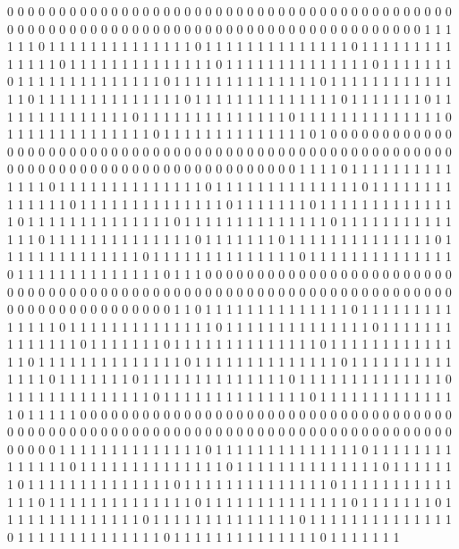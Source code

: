 0 0 0 0 0 0 0 0 0 0 0 0 0 0 0 0 0 0 0 0 0 0 0 0 0 0 0 0 0 0 0 0 0 0 0 0 0 0 0 0 0 0 0 0 0 0 0 0 0 0 0 0 0 0 0 0 0 0 0 0 0 0 0 0 0 0 0 0 0 0 0 0 0 0 0 0 0 0 0 0 0 0 0 
1 1 1 1 1 1 0 1 1 1 1 1 1 1 1 1 1 1 1 1 1 0 1 1 1 1 1 1 1 1 1 1 1 1 1 1 0 1 1 1 1 1 1 1 1 1 1 1 1 1 1 0 1 1 1 1 1 1 1 1 1 1 1 1 1 1 0 1 1 1 1 1 1 1 1 1 1 1 1 1 1 0 1 
1 1 1 1 1 1 0 1 1 1 1 1 1 1 1 1 1 1 1 1 1 0 1 1 1 1 1 1 1 1 1 1 1 1 1 1 0 1 1 1 1 1 1 1 1 1 1 1 1 1 1 0 1 1 1 1 1 1 1 1 1 1 1 1 1 1 0 1 1 1 1 1 1 1 1 1 1 1 1 1 1 0 1 
1 1 1 1 1 1 0 1 1 1 1 1 1 1 1 1 1 1 1 1 1 0 1 1 1 1 1 1 1 1 1 1 1 1 1 1 0 1 1 1 1 1 1 1 1 1 1 1 1 1 1 0 1 1 1 1 1 1 1 1 1 1 1 1 1 1 0 1 1 1 1 1 1 1 1 1 1 1 1 1 1 0 1 
0 0 0 0 0 0 0 0 0 0 0 0 0 0 0 0 0 0 0 0 0 0 0 0 0 0 0 0 0 0 0 0 0 0 0 0 0 0 0 0 0 0 0 0 0 0 0 0 0 0 0 0 0 0 0 0 0 0 0 0 0 0 0 0 0 0 0 0 0 0 0 0 0 0 0 0 0 0 0 0 0 0 0 
1 1 1 1 0 1 1 1 1 1 1 1 1 1 1 1 1 1 1 0 1 1 1 1 1 1 1 1 1 1 1 1 1 1 0 1 1 1 1 1 1 1 1 1 1 1 1 1 1 0 1 1 1 1 1 1 1 1 1 1 1 1 1 1 0 1 1 1 1 1 1 1 1 1 1 1 1 1 1 0 1 1 1 
1 1 1 1 0 1 1 1 1 1 1 1 1 1 1 1 1 1 1 0 1 1 1 1 1 1 1 1 1 1 1 1 1 1 0 1 1 1 1 1 1 1 1 1 1 1 1 1 1 0 1 1 1 1 1 1 1 1 1 1 1 1 1 1 0 1 1 1 1 1 1 1 1 1 1 1 1 1 1 0 1 1 1 
1 1 1 1 0 1 1 1 1 1 1 1 1 1 1 1 1 1 1 0 1 1 1 1 1 1 1 1 1 1 1 1 1 1 0 1 1 1 1 1 1 1 1 1 1 1 1 1 1 0 1 1 1 1 1 1 1 1 1 1 1 1 1 1 0 1 1 1 1 1 1 1 1 1 1 1 1 1 1 0 1 1 1 
0 0 0 0 0 0 0 0 0 0 0 0 0 0 0 0 0 0 0 0 0 0 0 0 0 0 0 0 0 0 0 0 0 0 0 0 0 0 0 0 0 0 0 0 0 0 0 0 0 0 0 0 0 0 0 0 0 0 0 0 0 0 0 0 0 0 0 0 0 0 0 0 0 0 0 0 0 0 0 0 0 0 0 
1 1 0 1 1 1 1 1 1 1 1 1 1 1 1 1 1 0 1 1 1 1 1 1 1 1 1 1 1 1 1 1 0 1 1 1 1 1 1 1 1 1 1 1 1 1 1 0 1 1 1 1 1 1 1 1 1 1 1 1 1 1 0 1 1 1 1 1 1 1 1 1 1 1 1 1 1 0 1 1 1 1 1 
1 1 0 1 1 1 1 1 1 1 1 1 1 1 1 1 1 0 1 1 1 1 1 1 1 1 1 1 1 1 1 1 0 1 1 1 1 1 1 1 1 1 1 1 1 1 1 0 1 1 1 1 1 1 1 1 1 1 1 1 1 1 0 1 1 1 1 1 1 1 1 1 1 1 1 1 1 0 1 1 1 1 1 
1 1 0 1 1 1 1 1 1 1 1 1 1 1 1 1 1 0 1 1 1 1 1 1 1 1 1 1 1 1 1 1 0 1 1 1 1 1 1 1 1 1 1 1 1 1 1 0 1 1 1 1 1 1 1 1 1 1 1 1 1 1 0 1 1 1 1 1 1 1 1 1 1 1 1 1 1 0 1 1 1 1 1 
0 0 0 0 0 0 0 0 0 0 0 0 0 0 0 0 0 0 0 0 0 0 0 0 0 0 0 0 0 0 0 0 0 0 0 0 0 0 0 0 0 0 0 0 0 0 0 0 0 0 0 0 0 0 0 0 0 0 0 0 0 0 0 0 0 0 0 0 0 0 0 0 0 0 0 0 0 0 0 0 0 0 0 
0 1 1 1 1 1 1 1 1 1 1 1 1 1 1 0 1 1 1 1 1 1 1 1 1 1 1 1 1 1 0 1 1 1 1 1 1 1 1 1 1 1 1 1 1 0 1 1 1 1 1 1 1 1 1 1 1 1 1 1 0 1 1 1 1 1 1 1 1 1 1 1 1 1 1 0 1 1 1 1 1 1 1 
0 1 1 1 1 1 1 1 1 1 1 1 1 1 1 0 1 1 1 1 1 1 1 1 1 1 1 1 1 1 0 1 1 1 1 1 1 1 1 1 1 1 1 1 1 0 1 1 1 1 1 1 1 1 1 1 1 1 1 1 0 1 1 1 1 1 1 1 1 1 1 1 1 1 1 0 1 1 1 1 1 1 1 
0 1 1 1 1 1 1 1 1 1 1 1 1 1 1 0 1 1 1 1 1 1 1 1 1 1 1 1 1 1 0 1 1 1 1 1 1 1 1 1 1 1 1 1 1 0 1 1 1 1 1 1 1 1 1 1 1 1 1 1 0 1 1 1 1 1 1 1 1 1 1 1 1 1 1 0 1 1 1 1 1 1 1 
